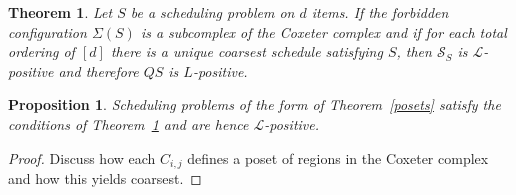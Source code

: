 \documentclass[12pt,reqno]{amsart}
\numberwithin{definition}{section}
\newtheorem{proposition}[definition]{Proposition}
\newtheorem{theorem}[definition]{Theorem}
\theoremstyle{definition}
\newcommand{\SSS}{\mathcal{S}}
\newcommand{\ncL}{\mathcal{L}}
\begin{document}




\begin{theorem} \label{unique} Let $S$ be a scheduling problem on $d$ items.  If the forbidden configuration $\Sigma(S)$ is a subcomplex of the Coxeter complex and if for each total ordering of $[d]$ there is a unique coarsest schedule satisfying $S$, then $\SSS_S$ is $\ncL$-positive and therefore $QS$ is $L$-positive. 
\end{theorem}


\begin{proposition}
Scheduling problems of the form of Theorem~\ref{posets} satisfy the conditions of Theorem~\ref{unique} and are hence $\ncL$-positive.
\end{proposition}

\begin{proof}
Discuss how each $C_{i,j}$ defines a poset of regions in the Coxeter complex and how this yields coarsest.
\end{proof}
\end{document}
